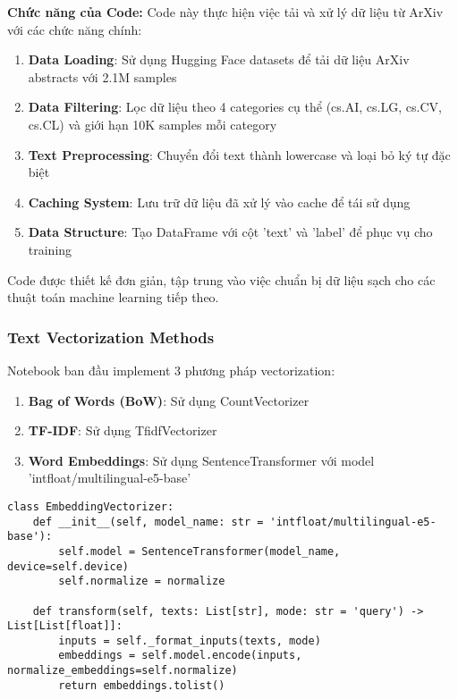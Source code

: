 \textbf{Chức năng của Code:}
Code này thực hiện việc tải và xử lý dữ liệu từ ArXiv với các chức năng chính:

\begin{enumerate}
    \item \textbf{Data Loading}: Sử dụng Hugging Face datasets để tải dữ liệu ArXiv abstracts với 2.1M samples
    
    \item \textbf{Data Filtering}: Lọc dữ liệu theo 4 categories cụ thể (cs.AI, cs.LG, cs.CV, cs.CL) và giới hạn 10K samples mỗi category
    
    \item \textbf{Text Preprocessing}: Chuyển đổi text thành lowercase và loại bỏ ký tự đặc biệt
    
    \item \textbf{Caching System}: Lưu trữ dữ liệu đã xử lý vào cache để tái sử dụng
    
    \item \textbf{Data Structure}: Tạo DataFrame với cột 'text' và 'label' để phục vụ cho training
\end{enumerate}

Code được thiết kế đơn giản, tập trung vào việc chuẩn bị dữ liệu sạch cho các thuật toán machine learning tiếp theo.

\subsubsection{Text Vectorization Methods}

Notebook ban đầu implement 3 phương pháp vectorization:

\begin{enumerate}
    \item \textbf{Bag of Words (BoW)}: Sử dụng CountVectorizer
    \item \textbf{TF-IDF}: Sử dụng TfidfVectorizer  
    \item \textbf{Word Embeddings}: Sử dụng SentenceTransformer với model 'intfloat/multilingual-e5-base'
\end{enumerate}

\begin{verbatim}
class EmbeddingVectorizer:
    def __init__(self, model_name: str = 'intfloat/multilingual-e5-base'):
        self.model = SentenceTransformer(model_name, device=self.device)
        self.normalize = normalize
        
    def transform(self, texts: List[str], mode: str = 'query') -> List[List[float]]:
        inputs = self._format_inputs(texts, mode)
        embeddings = self.model.encode(inputs, normalize_embeddings=self.normalize)
        return embeddings.tolist()
\end{verbatim}

